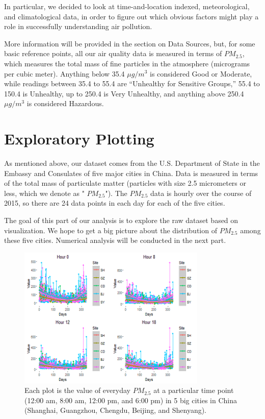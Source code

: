 \documentclass[11pt]{article} %
\begin{document}
In particular, we decided to look at time-and-location indexed, meteorological, and climatological data,
in order to figure out which obvious factors might play a role in successfully understanding air pollution.

More information will be provided in the section on Data Sources, 
but, for some basic reference points, all our air quality data is measured in terms of 
\(PM_{2.5}\), which measures the 
total mass of fine particles in the atmosphere (micrograms
per cubic meter). Anything below 35.4 \(\mu g/m^3\) is considered
Good or Moderate, while readings between 35.4 to 55.4 are ``Unhealthy for Sensitive Groups,''
55.4 to 150.4 is Unhealthy, up to 250.4 is Very Unhealthy, and anything above 250.4  \(\mu g/m^3\)
is considered Hazardous.





\section{Exploratory Plotting}

	As mentioned above, our dataset comes from the U.S. Department of State in the Embassy and Consulates of five major cities in China. Data is measured in terms of the total mass of particulate matter (particles with size 2.5 micrometers or less, which we denote as " \(PM_{2.5}\)"). The  \(PM_{2.5}\) data is hourly over the course of 2015, so there are 24 data points in each day for each of the five cities.

	The goal of this part of our analysis is to explore the raw dataset based on visualization. We hope to get a big picture about the distribution of  \(PM_{2.5}\) among these five cities. Numerical analysis will be conducted in the next part.
	
\begin{figure}[!ht]
  \centering
    \includegraphics[width=0.8\textwidth]{Figure1-1}
      \caption{Each plot is the value of everyday \(PM_{2.5}\) at a particular time point (12:00 am, 8:00 am, 12:00 pm, and 6:00 pm) in 5 big cities in China (Shanghai, Guangzhou, Chengdu, Beijing, and Shenyang).
}
\end{figure}
\end{document}
